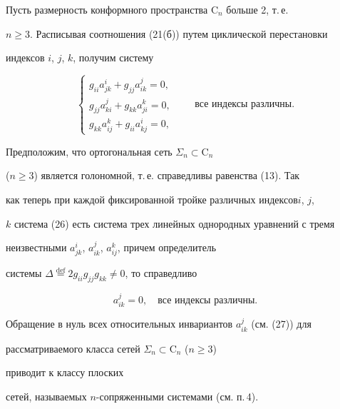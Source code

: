 Пусть размерность конформного пространства $\mathrm C_n$ больше 2, т.\,е. 


$n\ge3$. Расписывая соотношения (21(б)) путем циклической перестановки 


индексов $i$, $j$, $k$, получим систему 


\begin{equation} 


\begin{cases} 


g_{ii}a^i_{jk}+g_{jj}a^j_{ik}=0,\\ 


g_{jj}a^j_{ki}+g_{kk}a^k_{ji}=0,\\ 


g_{kk}a^k_{ij}+g_{ii}a^i_{kj}=0,


\end{cases} 


\qquad \text{все индексы различны}. 


\end{equation} 


 


Предположим, что ортогональная сеть $\Sigma_n\subset\mathrm C_n$ 


($n\ge3$) является голономной, т.\,е. справедливы равенства (13). Так 


как теперь при каждой фиксированной тройке различных индексов\linebreak $i$, $j$, 


$k$ система (26) есть система трех линейных однородных уравнений с тремя 


неизвестными $a^i_{jk}$, $a^j_{ik}$, $a^k_{ij}$, причем  определитель  


системы  $\Delta\overset{\mathrm 


{def}}{=}{}2g_{ii}g_{jj}g_{kk}\ne0$, то справедливо 


\begin{equation} 


a^j_{ik}=0,\quad \text{все индексы различны}. 


\end{equation} 


Обращение в нуль всех относительных инвариантов $a^j_{ik}$ (см. (27)) для 


рассматриваемого класса сетей $\Sigma_n\subset\mathrm C_n$ ($n\ge3$) 


приводит к классу плоских 


сетей, называемых $n$-сопряженными системами (см. п.\,4). 


